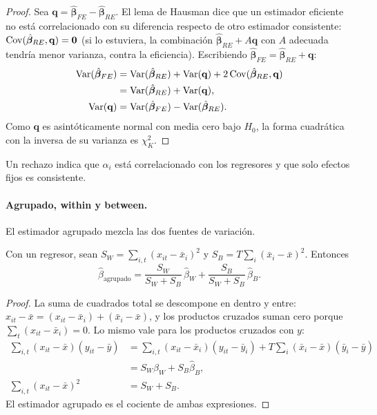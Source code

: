 \begin{proof}
Sea $\mathbf q=\hat{\boldsymbol\beta}_{FE}-\hat{\boldsymbol\beta}_{RE}$. El lema de Hausman dice que un estimador eficiente no está
correlacionado con su diferencia respecto de otro estimador consistente: $\operatorname{Cov}(\hat{\boldsymbol\beta}_{RE},\mathbf q)=\mathbf 0$ (si lo
estuviera, la combinación $\hat{\boldsymbol\beta}_{RE}+A\mathbf q$ con $A$ adecuada tendría menor varianza, contra la eficiencia).
Escribiendo $\hat{\boldsymbol\beta}_{FE}=\hat{\boldsymbol\beta}_{RE}+\mathbf q$:
\begin{align*}
  \operatorname{Var}(\hat{\boldsymbol\beta}_{FE}) &= \operatorname{Var}(\hat{\boldsymbol\beta}_{RE})+\operatorname{Var}(\mathbf q)+2\operatorname{Cov}(\hat{\boldsymbol\beta}_{RE},\mathbf q)\\
                                    &= \operatorname{Var}(\hat{\boldsymbol\beta}_{RE})+\operatorname{Var}(\mathbf q),\\
  \operatorname{Var}(\mathbf q) &= \operatorname{Var}(\hat{\boldsymbol\beta}_{FE})-\operatorname{Var}(\hat{\boldsymbol\beta}_{RE}).
\end{align*}
Como $\mathbf q$ es asintóticamente normal con media cero bajo $H_0$, la forma cuadrática con la inversa de su varianza es
$\chi^2_K$.
\end{proof}

Un rechazo indica que $\alpha_i$ está correlacionado con los regresores y que solo efectos fijos es consistente.

\paragraph{Agrupado, within y between.} El estimador agrupado mezcla las dos fuentes de variación.

\begin{proposicion}\label{prop:mezclapanel}
Con un regresor, sean $S_W=\sum_{i,t}(x_{it}-\bar x_i)^2$ y $S_B=T\sum_i(\bar x_i-\bar x)^2$. Entonces
\[
  \hat\beta_{\text{agrupado}}=\frac{S_W}{S_W+S_B}\,\hat\beta_W+\frac{S_B}{S_W+S_B}\,\hat\beta_B .
\]
\end{proposicion}

\begin{proof}
La suma de cuadrados total se descompone en dentro y entre: $x_{it}-\bar x=(x_{it}-\bar x_i)+(\bar x_i-\bar x)$, y los
productos cruzados suman cero porque $\sum_t(x_{it}-\bar x_i)=0$. Lo mismo vale para los productos cruzados con $y$:
\begin{align*}
  \sum_{i,t}(x_{it}-\bar x)(y_{it}-\bar y) &= \sum_{i,t}(x_{it}-\bar x_i)(y_{it}-\bar y_i)+T\sum_i(\bar x_i-\bar x)(\bar y_i-\bar y)\\
                                           &= S_W\hat\beta_W+S_B\hat\beta_B,\\
  \sum_{i,t}(x_{it}-\bar x)^2 &= S_W+S_B .
\end{align*}
El estimador agrupado es el cociente de ambas expresiones.
\end{proof}

